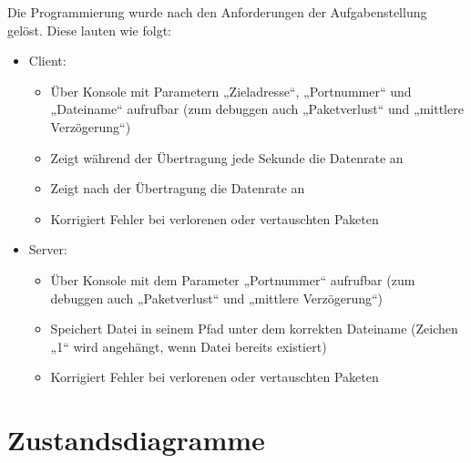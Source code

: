 Die Programmierung wurde nach den Anforderungen der Aufgabenstellung gelöst. Diese lauten wie folgt:
\begin{itemize}
\item Client:
\begin{itemize}
\item Über Konsole mit Parametern „Zieladresse“, „Portnummer“ und „Dateiname“ aufrufbar (zum debuggen auch „Paketverlust“ und „mittlere Verzögerung“)
\item Zeigt während der Übertragung jede Sekunde die Datenrate an
\item Zeigt nach der Übertragung die Datenrate an
\item Korrigiert Fehler bei verlorenen oder vertauschten Paketen
\end{itemize}
\item Server:
\begin{itemize}
\item Über Konsole mit dem Parameter „Portnummer“ aufrufbar (zum debuggen auch „Paketverlust“ und „mittlere Verzögerung“)
\item Speichert Datei in seinem Pfad unter dem korrekten Dateiname (Zeichen „1“ wird angehängt, wenn Datei bereits existiert)
\item Korrigiert Fehler bei verlorenen oder vertauschten Paketen
\end{itemize}
\end{itemize}

\section{Zustandsdiagramme}
\label{stated}
